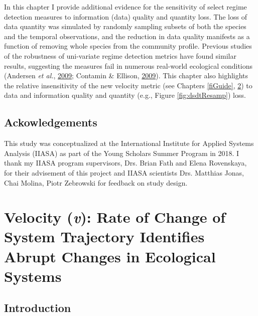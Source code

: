 \documentclass[print]{nuthesis}
\begin{document}
In this chapter I provide additional evidence for the sensitivity of select regime detection measures to information (data) quality and quantity loss. The loss of data quantity was simulated by randomly sampling subsets of both the species and the temporal observations, and the reduction in data quality manifests as a function of removing whole species from the community profile. Previous studies of the robustness of uni-variate regime detection metrics have found similar results, suggesting the measures fail in numerous real-world ecological conditions (Andersen \emph{et al.}, \protect\hyperlink{ref-andersen_ecological_2009}{2009}; Contamin \& Ellison, \protect\hyperlink{ref-contamin_indicators_2009}{2009}). This chapter also highlights the relative insensitivity of the new velocity metric (see Chapters \ref{fiGuide}, \ref{velocity}) to data and information quality and quantity (e.g., Figure \ref{fig:dsdtResamp}) loss.

\hypertarget{ackowledgements}{%
\section{Ackowledgements}\label{ackowledgements}}

This study was conceptualized at the International Institute for Applied Systems Analysis (IIASA) as part of the Young Scholars Summer Program in 2018. I thank my IIASA program supervisors, Drs. Brian Fath and Elena Rovenskaya, for their advisement of this project and IIASA scientists Drs. Matthias Jonas, Chai Molina, Piotr Zebrowski for feedback on study design.

\hypertarget{velocity}{%
\chapter{\texorpdfstring{Velocity (\emph{v}): Rate of Change of System Trajectory Identifies Abrupt Changes in Ecological Systems}{Velocity (v): Rate of Change of System Trajectory Identifies Abrupt Changes in Ecological Systems}}\label{velocity}}

\hypertarget{introduction-4}{%
\section{Introduction}\label{introduction-4}}
\end{document}
